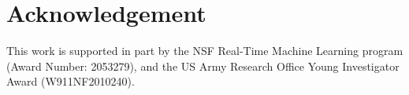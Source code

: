 \documentclass{article} \usepackage{iclr2021_conference,times}
\begin{document}
\section*{Acknowledgement}
\vspace{-0.5em}
This work is supported in part by the NSF Real-Time Machine Learning program (Award Number: 2053279), and the US Army Research Office
Young Investigator Award (W911NF2010240).
\end{document}
